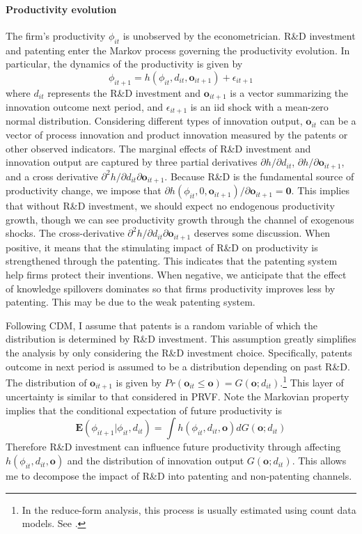 \paragraph{Productivity evolution}The firm's productivity $\phi_{it}$ is unobserved by the econometrician. R\&D investment and patenting enter the Markov process governing the productivity evolution. In particular, the dynamics of the productivity is given by
\begin{equation}
    \phi_{it+1} = h(\phi_{it},d_{it},\mathbf{o}_{it+1})+\epsilon_{it+1}
\end{equation}
where $d_{it}$ represents the R\&D investment and $\mathbf{o}_{it+1}$ is a vector summarizing the innovation outcome next period, and $\epsilon_{it+1}$ is an iid shock with a mean-zero normal distribution. Considering different types of innovation output, $\mathbf{o}_{it}$ can be a vector of process innovation and product innovation measured by the patents or other observed indicators. The marginal effects of R\&D investment and innovation output are captured by three partial derivatives $\partial h/\partial d_{it}$, $\partial h/\partial \mathbf{o}_{it+1}$, and a cross derivative $\partial ^2h/\partial d_{it} \partial \mathbf{o}_{it+1}$. Because R\&D is the fundamental source of productivity change, we impose that $ \partial h(\phi_{it}, 0, \mathbf{o}_{it+1})/\partial\mathbf{o}_{it+1} = \mathbf{0}$. This implies that without R\&D investment, we should expect no endogenous productivity growth, though we can see productivity growth through the channel of exogenous shocks. The cross-derivative $\partial ^2h/\partial d_{it} \partial \mathbf{o}_{it+1}$ deserves some discussion. When positive, it means that the stimulating impact of R\&D on productivity is strengthened through the patenting. This indicates that the patenting system help firms protect their inventions. When negative, we anticipate that the effect of knowledge spillovers dominates so that firms productivity improves less by patenting. This may be due to the weak patenting system.

Following CDM, I assume that patents is a random variable of which the distribution is determined by R\&D investment. This assumption greatly simplifies the analysis by only considering the R\&D investment choice. Specifically, patents outcome in next period is assumed to be a distribution depending on past R\&D. The distribution of $\mathbf{o}_{it+1}$ is given by $Pr(\mathbf{o}_{it}\leq \mathbf{o}) = G(\mathbf{o};d_{it})$.\footnote{In the reduce-form analysis, this process is usually estimated using count data models. See \cite{hall1989research,hall2010}.} This layer of uncertainty is similar to that considered in PRVF. Note the Markovian property implies that the conditional expectation of future productivity is 
\begin{equation*}
    \mathbf{E}(\phi_{it+1}|\phi_{it}, d_{it})=\int h(\phi_{it},d_{it},\mathbf{o})dG(\mathbf{o};d_{it})
\end{equation*}
Therefore R\&D investment can influence future productivity through affecting $h(\phi_{it}, d_{it},\mathbf{o})$ and the distribution of innovation output $G(\mathbf{o}; d_{it})$. This allows me to decompose the impact of R\&D into patenting and non-patenting channels.


